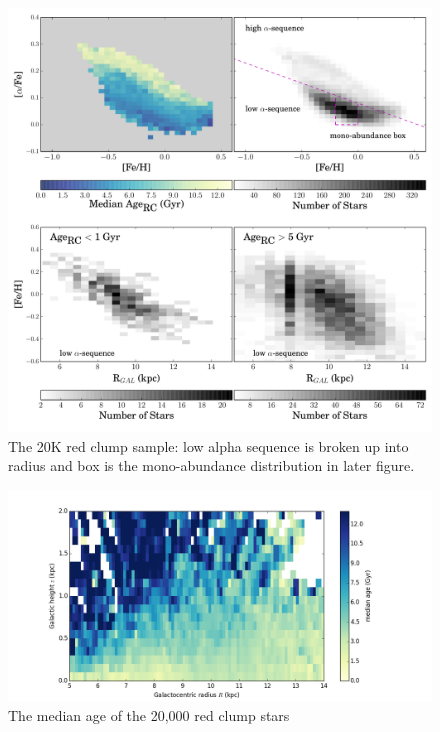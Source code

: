 \documentclass[12pt, preprint]{aastex}
\begin{document}
\begin{figure}[p!]
\centering
 \includegraphics[scale=0.4]{./plots/redclump_4panel.pdf}
    \caption{The 20K red clump sample: low alpha sequence is broken up into radius and box is the mono-abundance distribution in later figure.}
\label{fig:redclump}
\end{figure}

\begin{figure}[p!]
\centering
    \includegraphics[scale=0.45]{./plots/median_age_abs.png}
    \caption{The median age of the 20,000 red clump stars  }
\label{fig:redclump_age}
\vspace{360pt}
\end{figure}
\end{document}
